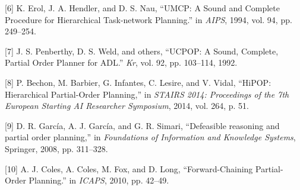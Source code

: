 \documentclass[]{article}
\begin{document}
\hypertarget{ref-erolux5fumcp:ux5f1994}{}
{[}6{]} K. Erol, J. A. Hendler, and D. S. Nau, ``UMCP: A Sound and
Complete Procedure for Hierarchical Task-network Planning.'' in
\emph{AIPS}, 1994, vol. 94, pp. 249--254.

\hypertarget{ref-penberthyux5fucpop:ux5f1992}{}
{[}7{]} J. S. Penberthy, D. S. Weld, and others, ``UCPOP: A Sound,
Complete, Partial Order Planner for ADL.'' \emph{Kr}, vol. 92, pp.
103--114, 1992.

\hypertarget{ref-bechonux5fhipop:ux5f2014}{}
{[}8{]} P. Bechon, M. Barbier, G. Infantes, C. Lesire, and V. Vidal,
``HiPOP: Hierarchical Partial-Order Planning,'' in \emph{STAIRS 2014:
Proceedings of the 7th European Starting AI Researcher Symposium}, 2014,
vol. 264, p. 51.

\hypertarget{ref-garciaux5fdefeasibleux5f2008}{}
{[}9{]} D. R. García, A. J. García, and G. R. Simari, ``Defeasible
reasoning and partial order planning,'' in \emph{Foundations of
Information and Knowledge Systems}, Springer, 2008, pp. 311--328.

\hypertarget{ref-colesux5fforward-chainingux5f2010}{}
{[}10{]} A. J. Coles, A. Coles, M. Fox, and D. Long, ``Forward-Chaining
Partial-Order Planning.'' in \emph{ICAPS}, 2010, pp. 42--49.
\end{document}
